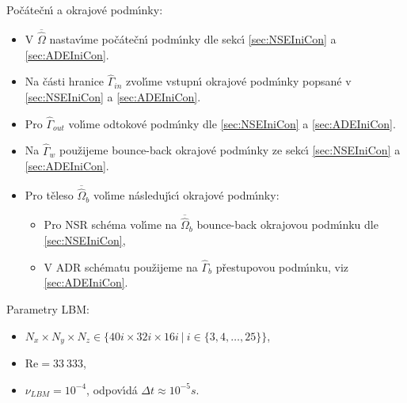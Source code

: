 \begin{tcolorbox}[colframe=blue, title = \'{U}loha \ref{sub:D10m3}]
                Po\v{c}\'{a}te\v{c}n\'{\i} a okrajov\'{e} podm\'{\i}nky:
                \begin{itemize}
                    \item V $\overline{\hat{\Omega}}$ nastav\'{\i}me po\v{c}\'{a}te\v{c}n\'{\i} podm\'{\i}nky dle sekc\'{\i} \ref{sec:NSEIniCon} a \ref{sec:ADEIniCon}.
                    \item Na \v{c}\'{a}sti hranice $\hat{\Gamma}_{in}$ zvol\'{\i}me vstupn\'{\i} okrajov\'{e} podm\'{\i}nky popsan\'{e} v \ref{sec:NSEIniCon} a \ref{sec:ADEIniCon}.
                    \item Pro $\hat{\Gamma}_{out}$ vol\'{\i}me odtokov\'{e} podm\'{\i}nky dle \ref{sec:NSEIniCon} a \ref{sec:ADEIniCon}.
                    \item Na $\hat{\Gamma}_{w}$ pou\v{z}ijeme bounce-back okrajov\'{e} podm\'{\i}nky ze sekc\'{\i} \ref{sec:NSEIniCon} a \ref{sec:ADEIniCon}.
                    \item Pro t\v{e}leso $\overline{\hat{\Omega}}_b$ vol\'{\i}me n\'{a}sleduj\'{\i}c\'{\i} okrajov\'{e} podm\'{\i}nky: \begin{itemize}
                        \item Pro NSR sch\'{e}ma vol\'{\i}me na $\overline{\hat{\Omega}}_b$ bounce-back okrajovou podm\'{\i}nku dle \ref{sec:NSEIniCon},
                        \item V ADR sch\'{e}matu pou\v{z}ijeme na $\hat{\Gamma}_b$ p\v{r}estupovou podm\'{\i}nku, viz \ref{sec:ADEIniCon}.  
                    \end{itemize}
                \end{itemize}
                
                Parametry LBM:
                \begin{itemize}
                    \item $N_x \times N_y \times N_z \in \{ 40i \times 32i \times 16i\ | \ i \in \{ 3,4,\dots,25 \} \} $,
                    \item $\mathrm{Re} = 33 \ 333$,
                    \item $\nu_{LBM} = 10^{-4}$, odpov\'{\i}d\'{a} $\Delta t \approx 10^{-5} s$.
                \end{itemize}
            \end{tcolorbox}

